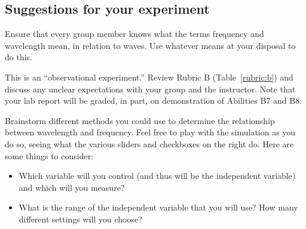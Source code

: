 \subsection{Suggestions for your experiment}

\begin{steps}
	
	\item Ensure that every group member knows what the terms frequency and wavelength mean, in relation to waves. Use whatever means at your disposal to do this.
	
	\item This is an ``observational experiment.'' Review Rubric B (Table~\ref{rubric:b}) and discuss any unclear expectations with your group and the instructor. Note that your lab report will be graded, in part, on demonstration of Abilities B7 and B8.
	
	
	\item Brainstorm different methods you could use to determine the relationship between wavelength and frequency. Feel free to play with the simulation as you do so, seeing what the various sliders and checkboxes on the right do. Here are some things to consider:
	\begin{itemize}
		\item Which variable will you control (and thus will be the independent variable) and which will you measure?
		
		\item What is the range of the independent variable that you will use? How many different settings will you choose?
		

\end{itemize}
\end{steps}
